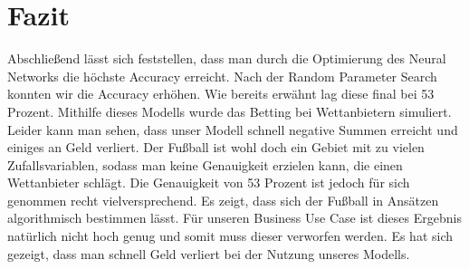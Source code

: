 \chapter{Fazit}
Abschließend lässt sich feststellen, dass man durch die Optimierung des Neural Networks die höchste Accuracy erreicht. Nach der Random Parameter Search konnten wir die Accuracy erhöhen. Wie bereits erwähnt lag diese final bei 53 Prozent. Mithilfe dieses Modells wurde das Betting bei Wettanbietern simuliert. Leider kann man sehen, dass unser Modell schnell negative Summen erreicht und einiges an Geld verliert. Der Fußball ist wohl doch ein Gebiet mit zu vielen Zufallsvariablen, sodass man keine Genauigkeit erzielen kann, die einen Wettanbieter schlägt. Die Genauigkeit von 53 Prozent ist jedoch für sich genommen recht vielversprechend. Es zeigt, dass sich der Fußball in Ansätzen algorithmisch bestimmen lässt. Für unseren Business Use Case ist dieses Ergebnis natürlich nicht hoch genug und somit muss dieser verworfen werden. Es hat sich gezeigt, dass man schnell Geld verliert bei der Nutzung unseres Modells.